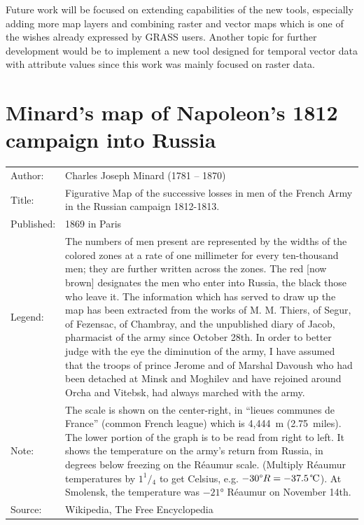 \documentclass[a4paper,12pt,oneside]{book}
\begin{document}
Future work will be focused on extending capabilities of the new tools,
especially adding more map layers and combining raster and vector maps
which is one of the wishes already expressed by GRASS users.
Another topic for further development would be to implement a new tool
designed for temporal vector data with attribute values since this work
was mainly focused on raster data. 




\newpage
\clearpage
{}
{}
\printbibliography

\cleardoublepage
{}
{}
\listoffigures
\cleardoublepage
{}
{}
\listoftables

\appendix
\chapter{Minard’s map of Napoleon’s 1812 campaign into Russia}
\label{appdx:minard}
\begin{singlespace}
\begin{center}
\setlength{\extrarowheight}{3pt}
 \begin{tabularx}{\linewidth}{lX}
 Author:& Charles Joseph Minard (1781 -- 1870)\\
 Title:& Figurative Map of the successive losses in men of the French Army in the Russian campaign 1812-1813.\\
 Published: & 1869 in Paris \\
 Legend:& The numbers of men present are represented by the widths of the colored zones
 at a rate of one millimeter for every ten-thousand men; they are further written across the zones.
 The red [now brown] designates the men who enter into Russia, the black those who leave it.
 The information which has served to draw up the map has been extracted from
 the works of M. M. Thiers, of Segur, of Fezensac, of Chambray, and the unpublished
 diary of Jacob, pharmacist of the army since October 28th.
 In order to better judge with the eye the diminution of the army,
 I have assumed that the troops of prince Jerome and of Marshal Davoush who had been detached
 at Minsk and Moghilev and have rejoined around Orcha and Vitebsk, had always marched with the army.\\
 Note: & 
The scale is shown on the center-right, in ``lieues communes de France'' (common French league)
which is 4,444~m (2.75~miles).
The lower portion of the graph is to be read from right to left. It shows the temperature on the army's return
from Russia, in degrees below freezing on the Réaumur scale. (Multiply Réaumur temperatures by $1 ^1\!/\!_4$ to get Celsius,
e.g. $-30\text{\textdegree} R = -37.5\,\text{\textcelsius}$).
At Smolensk, the temperature was $-21$° Réaumur on November 14th.\\
Source:& Wikipedia, The Free Encyclopedia \cite{wiki:Minard}
\end{tabularx}
\end{center}
\end{singlespace}
\end{document}
